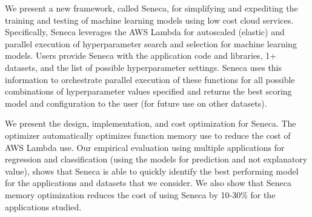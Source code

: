 
We present a new framework, called Seneca, for simplifying and expediting
the training and testing of machine learning models
using low cost cloud services.
Specifically, Seneca leverages the AWS Lambda for autoscaled
(elastic) and parallel execution of hyperparameter search 
and selection for machine learning models.  
Users provide Seneca with the application code and libraries, 1+ datasets, and the list 
of possible hyperparameter settings.  
Seneca uses this information to orchestrate parallel execution of these functions for all possible 
combinations of hyperparameter values specified and returns the best scoring model
and configuration to the user (for future use on other datasets).

We present the design, implementation, and cost optimization for Seneca.
The optimizer automatically optimizes function memory use to reduce the cost
of AWS Lambda use.  Our empirical evaluation using
multiple applications for regression and classification (using
the models for prediction and not explanatory value), shows that Seneca is able to quickly
identify the best performing model for the applications and datasets that we consider.  
We also show that Seneca memory optimization reduces the cost of using
Seneca by 10-30\% for the applications studied.


